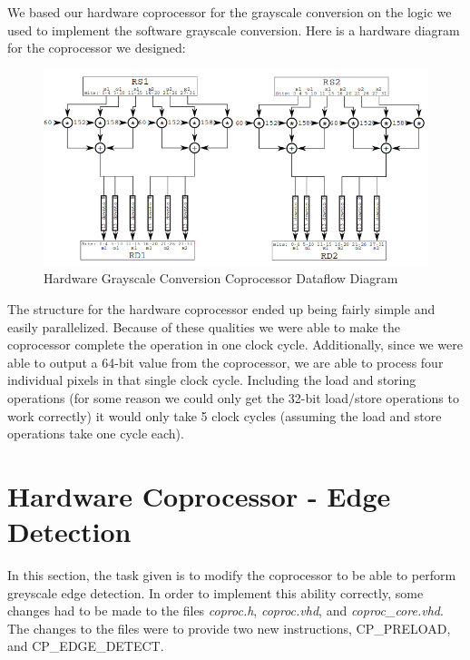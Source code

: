 \documentclass{article}
\begin{document}
We based our hardware coprocessor for the grayscale conversion on the logic we used to implement the software grayscale conversion. Here is a hardware diagram for the coprocessor we designed:

	 \begin{figure}[H]
	 	\begin{center}
	 		\includegraphics[scale=0.6]{../part5_files/Grayscale_coprocessor_dataflow.png}
	 		\caption{Hardware Grayscale Conversion Coprocessor Dataflow Diagram}
	 	\end{center}
	 \end{figure}

The structure for the hardware coprocessor ended up being fairly simple and easily parallelized. Because of these qualities we were able to make the coprocessor complete the operation in one clock cycle. Additionally, since we were able to output a 64-bit value from the coprocessor, we are able to process four individual pixels in that single clock cycle. Including the load and storing operations (for some reason we could only get the 32-bit load/store operations to work correctly) it would only take 5 clock cycles (assuming the load and store operations take one cycle each).

\section{Hardware Coprocessor - Edge Detection}
In this section, the task given is to modify the coprocessor to be able to perform greyscale edge detection. In order to implement this ability correctly, some changes had to be made to the files \textit{coproc.h}, \textit{coproc.vhd}, and \textit{coproc\_core.vhd}. The changes to the files were to provide two new instructions, CP\_PRELOAD, and CP\_EDGE\_DETECT.\\
\end{document}
